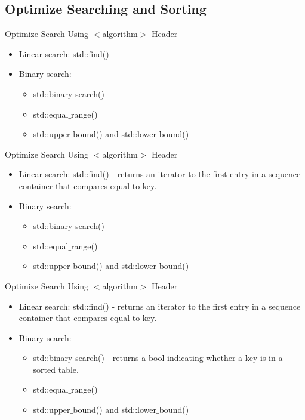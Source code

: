 \documentclass[aspectratio=169,xcolor=dvipsnames]{beamer}
\begin{document}
\subsection{Optimize Searching and Sorting}
\begin{frame}{Optimize Search Using $<$algorithm$>$ Header}
    \begin{itemize}
        \item Linear search: std::find()
        \item Binary search:
        \begin{itemize}
            \item std::binary$\_$search() 
            \item std::equal$\_$range()
            \item std::upper$\_$bound() and std::lower$\_$bound()
        \end{itemize}
    \end{itemize}
\end{frame}

\begin{frame}{Optimize Search Using $<$algorithm$>$ Header}
    \begin{itemize}
        \item Linear search: std::find() - returns an iterator to the first entry in a sequence container that compares equal to key.
        \item Binary search:
        \begin{itemize}
            \item std::binary$\_$search()
            \item std::equal$\_$range()
            \item std::upper$\_$bound() and std::lower$\_$bound()
        \end{itemize}
    \end{itemize}
\end{frame}

\begin{frame}{Optimize Search Using $<$algorithm$>$ Header}
    \begin{itemize}
        \item Linear search: std::find() - returns an iterator to the first entry in a sequence container that compares equal to key.
        \item Binary search:
        \begin{itemize}
            \item std::binary$\_$search() - returns a bool indicating whether a key is in a sorted table.
            \item std::equal$\_$range()
            \item std::upper$\_$bound() and std::lower$\_$bound()
        \end{itemize}
    \end{itemize}
\end{frame}
\end{document}
